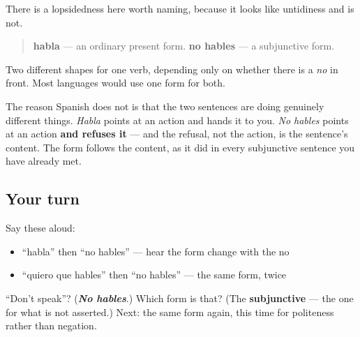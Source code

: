 \begin{culture}
There is a lopsidedness here worth naming, because it looks like untidiness and is not.

\begin{quote}
\textbf{habla} — an ordinary present form. \textbf{no hables} — a subjunctive form.
\end{quote}

Two different shapes for one verb, depending only on whether there is a \emph{no} in front. Most languages would use one form for both.

The reason Spanish does not is that the two sentences are doing genuinely different things. \emph{Habla} points at an action and hands it to you. \emph{No hables} points at an action \textbf{and refuses it} — and the refusal, not the action, is the sentence's content. The form follows the content, as it did in every subjunctive sentence you have already met.
\end{culture}

\subsection*{Your turn}
Say these aloud:

\begin{itemize}
\raggedright
  \item \textquotedblleft{}habla\textquotedblright{} then \textquotedblleft{}no hables\textquotedblright{} — hear the form change with the no
  \item \textquotedblleft{}quiero que hables\textquotedblright{} then \textquotedblleft{}no hables\textquotedblright{} — the same form, twice
\end{itemize}

\begin{tcolorbox}[breakable,colback=teal!4,colframe=teal!35!black,title={Before you move on}]
\textquotedblleft{}Don't speak\textquotedblright{}? (\emph{\textbf{No hables}}.) Which form is that? (The \textbf{subjunctive} — the one for what is not asserted.) Next: the same form again, this time for politeness rather than negation.
\end{tcolorbox}
